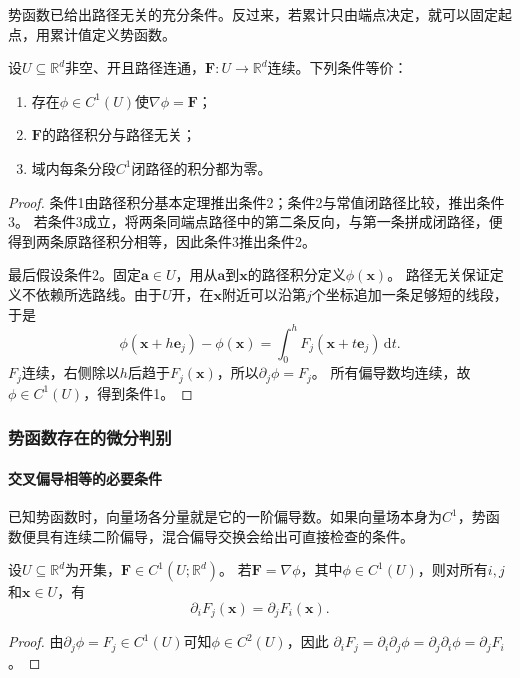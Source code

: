 势函数已给出路径无关的充分条件。反过来，若累计只由端点决定，就可以固定起点，用累计值定义势函数。
\begin{theorem}[路径无关的等价条件]
设$U\subseteq\mathbb R^d$非空、开且路径连通，$\bm F:U\to\mathbb R^d$连续。下列条件等价：
\begin{enumerate}
 \item 存在$\phi\in C^1(U)$使$\nabla\phi=\bm F$；
 \item $\bm F$的路径积分与路径无关；
 \item 域内每条分段$C^1$闭路径的积分都为零。
\end{enumerate}
\end{theorem}
\begin{proof}
条件1由路径积分基本定理推出条件2；条件2与常值闭路径比较，推出条件3。
若条件3成立，将两条同端点路径中的第二条反向，与第一条拼成闭路径，便得到两条原路径积分相等，因此条件3推出条件2。

最后假设条件2。固定$\bm a\in U$，用从$\bm a$到$\bm x$的路径积分定义$\phi(\bm x)$。
路径无关保证定义不依赖所选路线。由于$U$开，在$\bm x$附近可以沿第$j$个坐标追加一条足够短的线段，于是
\[
 \phi(\bm x+h\bm e_j)-\phi(\bm x)
 =\int_0^h F_j(\bm x+t\bm e_j)\,\mathrm dt.
\]
$F_j$连续，右侧除以$h$后趋于$F_j(\bm x)$，所以$\partial_j\phi=F_j$。
所有偏导数均连续，故$\phi\in C^1(U)$，得到条件1。
\end{proof}

\subsubsection{势函数存在的微分判别}

\paragraph{交叉偏导相等的必要条件}

已知势函数时，向量场各分量就是它的一阶偏导数。如果向量场本身为$C^1$，势函数便具有连续二阶偏导，混合偏导交换会给出可直接检查的条件。
\begin{theorem}[保守场的必要条件]
设$U\subseteq\mathbb R^d$为开集，$\bm F\in C^1(U;\mathbb R^d)$。
若$\bm F=\nabla\phi$，其中$\phi\in C^1(U)$，则对所有$i,j$和$\bm x\in U$，有
\[
 \partial_iF_j(\bm x)=\partial_jF_i(\bm x).
\]
\end{theorem}
\begin{proof}
由$\partial_j\phi=F_j\in C^1(U)$可知$\phi\in C^2(U)$，因此
$\partial_iF_j=\partial_i\partial_j\phi=\partial_j\partial_i\phi=\partial_jF_i$。
\end{proof}

